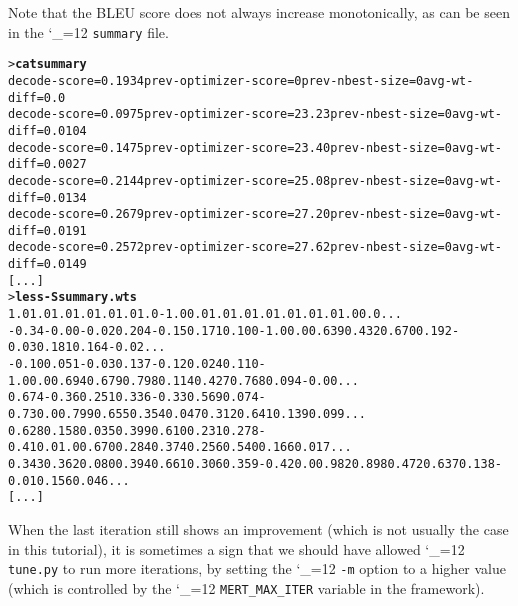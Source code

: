 \documentclass[11pt,letterpaper]{article}
\def\code{\begingroup\catcode`\_=12 \codex}
\newcommand{\codex}[1]{\texttt{#1}\endgroup}
\begin{document}
Note that the BLEU score does not always increase monotonically, as can
be seen in the \code{summary} file.
\begin{footnotesize}
\begin{alltt}
> \textbf{cat summary}
decode-score=0.1934 prev-optimizer-score=0 prev-nbest-size=0 avg-wt-diff=0.0
decode-score=0.0975 prev-optimizer-score=23.23 prev-nbest-size=0 avg-wt-diff=0.0104
decode-score=0.1475 prev-optimizer-score=23.40 prev-nbest-size=0 avg-wt-diff=0.0027
decode-score=0.2144 prev-optimizer-score=25.08 prev-nbest-size=0 avg-wt-diff=0.0134
decode-score=0.2679 prev-optimizer-score=27.20 prev-nbest-size=0 avg-wt-diff=0.0191
decode-score=0.2572 prev-optimizer-score=27.62 prev-nbest-size=0 avg-wt-diff=0.0149
[...]
> \textbf{less -S summary.wts}
1.0   1.0   1.0   1.0   1.0   1.0   1.0   -1.0  0.0 1.0   1.0   1.0   1.0   1.0   1.0   1.0   0.0   ...
-0.34 -0.00 -0.02 0.204 -0.15 0.171 0.100 -1.0  0.0 0.639 0.432 0.670 0.192 -0.03 0.181 0.164 -0.02 ...
-0.10 0.051 -0.03 0.137 -0.12 0.024 0.110 -1.0  0.0 0.694 0.679 0.798 0.114 0.427 0.768 0.094 -0.00 ...
0.674 -0.36 0.251 0.336 -0.33 0.569 0.074 -0.73 0.0 0.799 0.655 0.354 0.047 0.312 0.641 0.139 0.099 ...
0.628 0.158 0.035 0.399 0.610 0.231 0.278 -0.41 0.0 1.0   0.670 0.284 0.374 0.256 0.540 0.166 0.017 ...
0.343 0.362 0.080 0.394 0.661 0.306 0.359 -0.42 0.0 0.982 0.898 0.472 0.637 0.138 -0.01 0.156 0.046 ...
[...]
\end{alltt}
\end{footnotesize}
When the last iteration still shows an improvement (which is not usually the
case in this tutorial), it is sometimes a sign that we should have allowed
\code{tune.py} to run more iterations, by setting the \code{-m} option to a
higher value (which is controlled by the \code{MERT_MAX_ITER} variable in the
framework).
\end{document}
